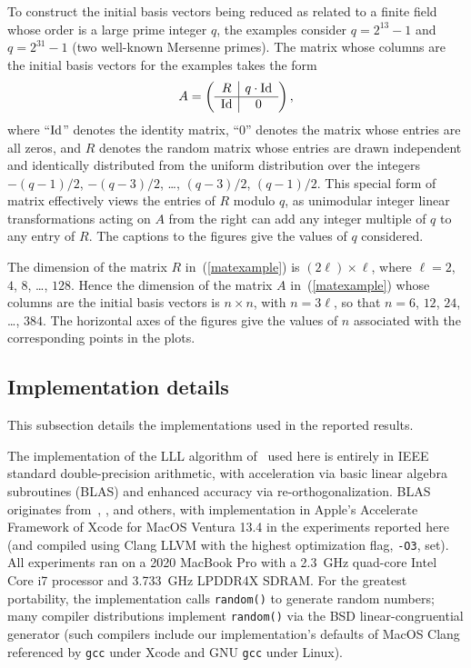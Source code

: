 \documentclass{article}
\def\Id{\rm Id}
\begin{document}
To construct the initial basis vectors being reduced
as related to a finite field whose order is a large prime integer $q$,
the examples consider $q = 2^{13} - 1$ and $q = 2^{31} - 1$
(two well-known Mersenne primes).
The matrix whose columns are the initial basis vectors for the examples
takes the form
%
\begin{equation}
\label{matexample}
A = \left( \begin{array}{c|c} R & q \cdot \Id \\\hline
                              \Id & 0 \end{array} \right),
\end{equation}
%
where ``$\Id$'' denotes the identity matrix,
``$0$'' denotes the matrix whose entries are all zeros,
and $R$ denotes the random matrix whose entries are drawn
independent and identically distributed from the uniform distribution
over the integers $-(q-1)/2$, $-(q-3)/2$, \dots, $(q-3)/2$, $(q-1)/2$.
This special form of matrix effectively views the entries of $R$ modulo $q$,
as unimodular integer linear transformations acting on $A$ from the right
can add any integer multiple of $q$ to any entry of $R$.
The captions to the figures give the values of $q$ considered.

The dimension of the matrix $R$ in~(\ref{matexample}) is
$(2 \ell) \times \ell$, where $\ell = 2$, $4$, $8$, \dots, $128$.
Hence the dimension of the matrix $A$ in~(\ref{matexample}) whose columns
are the initial basis vectors is $n \times n$, with $n = 3 \ell$,
so that $n = 6$, $12$, $24$, \dots, $384$.
The horizontal axes of the figures give the values of $n$
associated with the corresponding points in the plots.

\subsection{Implementation details}
\label{implementation}

This subsection details the implementations used in the reported results.

The implementation of the LLL algorithm of~\cite{lenstra-lenstra-lovasz}
used here is entirely in IEEE standard double-precision arithmetic,
with acceleration via basic linear algebra subroutines (BLAS)
and enhanced accuracy via re-orthogonalization.
BLAS originates from~\cite{lawson-hanson-kincaid-krogh},
\cite{blas}, and others, with implementation in Apple's Accelerate Framework
of Xcode for MacOS Ventura 13.4 in the experiments reported here
(and compiled using Clang LLVM with the highest optimization flag,
{\tt -O3}, set). All experiments ran on a 2020 MacBook Pro
with a 2.3~GHz quad-core Intel Core i7 processor
and 3.733~GHz LPDDR4X SDRAM.
For the greatest portability, the implementation calls {\tt random()}
to generate random numbers; many compiler distributions
implement {\tt random()} via the BSD linear-congruential generator
(such compilers include our implementation's defaults
of MacOS Clang referenced by {\tt gcc} under Xcode
and GNU {\tt gcc} under Linux).
\end{document}
